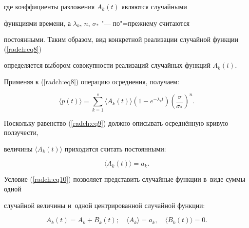 где коэффициенты разложения $A_k \left( t \right)$ являются случайными 

функциями времени, а $\lambda _k$, $n$, $\sigma _ * $ "--- по"=прежнему считаются 

постоянными. Таким образом, вид конкретной реализации случайной функции (\ref{radch:eq8}) 

определяется выбором совокупности реализаций случайных функций $A_k \left( t 

\right)$.



Применяя к (\ref{radch:eq8}) операцию осреднения, получаем:

\begin{equation}

\label{radch:eq9}

 \langle p\left( t \right) \rangle = \sum\limits_{k = 1}^s { \langle  A_k \left( t \right) \rangle  

\left( {1 - e^{ - \lambda _k t}} \right)\left( {\frac{\sigma }{\sigma _ * }} 

\right)^n} .

\end{equation}



Поскольку равенство (\ref{radch:eq9}) должно описывать осреднённую кривую ползучести, 

величины $ \langle  A_k \left( t \right) \rangle  $ приходится считать постоянными:

\begin{equation}

\label{radch:eq10}

 \langle  A_k \left( t \right) \rangle  = a_k .

\end{equation}

Условие (\ref{radch:eq10}) позволяет представить случайные функции в~виде суммы одной 

случайной величины и~одной центрированной случайной функции:

\begin{equation}

\label{radch:eq11}

A_k \left( t \right) = A_k + B_k \left( t \right);

\quad

 \langle  A_k \rangle  = a_k ,

\quad

 \langle  B_k \left( t \right) \rangle  = 0.

\end{equation}





